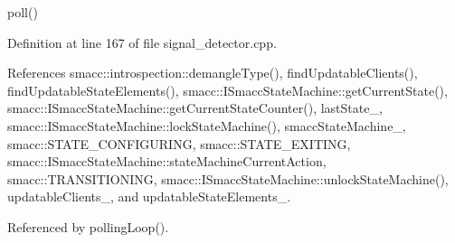 poll() 

Definition at line 167 of file signal\+\_\+detector.\+cpp.



References smacc\+::introspection\+::demangle\+Type(), find\+Updatable\+Clients(), find\+Updatable\+State\+Elements(), smacc\+::\+I\+Smacc\+State\+Machine\+::get\+Current\+State(), smacc\+::\+I\+Smacc\+State\+Machine\+::get\+Current\+State\+Counter(), last\+State\+\_\+, smacc\+::\+I\+Smacc\+State\+Machine\+::lock\+State\+Machine(), smacc\+State\+Machine\+\_\+, smacc\+::\+S\+T\+A\+T\+E\+\_\+\+C\+O\+N\+F\+I\+G\+U\+R\+I\+NG, smacc\+::\+S\+T\+A\+T\+E\+\_\+\+E\+X\+I\+T\+I\+NG, smacc\+::\+I\+Smacc\+State\+Machine\+::state\+Machine\+Current\+Action, smacc\+::\+T\+R\+A\+N\+S\+I\+T\+I\+O\+N\+I\+NG, smacc\+::\+I\+Smacc\+State\+Machine\+::unlock\+State\+Machine(), updatable\+Clients\+\_\+, and updatable\+State\+Elements\+\_\+.



Referenced by polling\+Loop().


